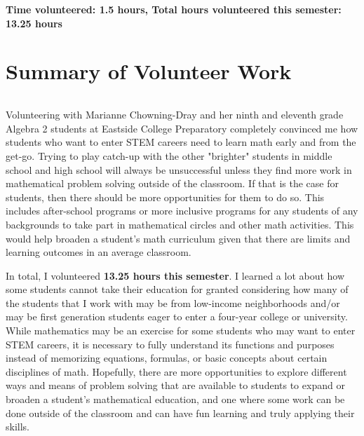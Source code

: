 \documentclass{article}
\begin{document}
\textbf{Time volunteered: 1.5 hours, Total hours volunteered this semester: 13.25 hours}


\part{Summary of Volunteer Work}

\paragraph{}Volunteering with Marianne Chowning-Dray and her ninth and eleventh grade Algebra 2 students at Eastside College Preparatory completely convinced me how students who want to enter STEM careers need to learn math early and from the get-go. Trying to play catch-up with the other "brighter" students in middle school and high school will always be unsuccessful unless they find more work in mathematical problem solving outside of the classroom. If that is the case for students, then there should be more opportunities for them to do so. This includes after-school programs or more inclusive programs for any students of any backgrounds to take part in mathematical circles and other math activities. This would help broaden a student's math curriculum given that there are limits and learning outcomes in an average classroom. 

In total, I volunteered \textbf{13.25 hours this semester}. I learned a lot about how some students cannot take their education for granted considering how many of the students that I work with may be from low-income neighborhoods and/or may be first generation students eager to enter a four-year college or university. While mathematics may be an exercise for some students who may want to enter STEM careers, it is necessary to fully understand its functions and purposes instead of memorizing equations, formulas, or basic concepts about certain disciplines of math. Hopefully, there are more opportunities to explore different ways and means of problem solving that are available to students to expand or broaden a student's mathematical education, and one where some work can be done outside of the classroom and can have fun learning and truly applying their skills. 
\end{document}
